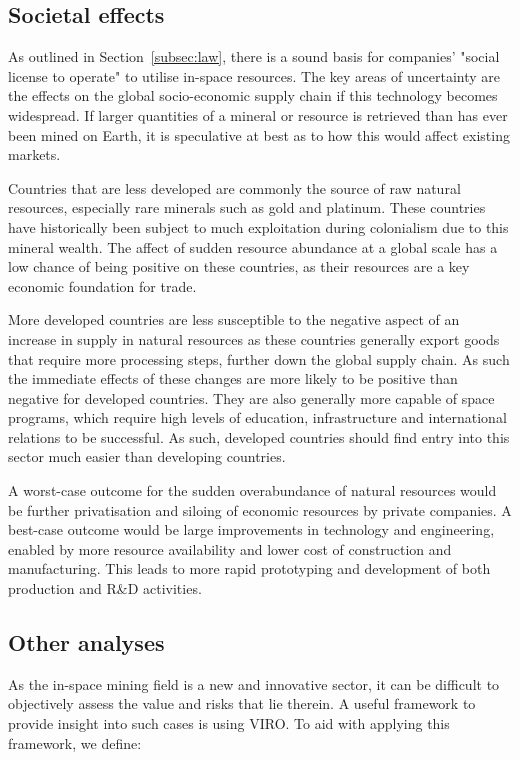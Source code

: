 \documentclass[conference]{IEEEtran}
\begin{document}
\subsection{Societal effects}
As outlined in Section~\ref{subsec:law}, there is a sound basis for companies' "social license to operate" to utilise in-space resources. The key areas of uncertainty are the effects on the global socio-economic supply chain if this technology becomes widespread. If larger quantities of a mineral or resource is retrieved than has ever been mined on Earth, it is speculative at best as to how this would affect existing markets. 

Countries that are less developed are commonly the source of raw natural resources, especially rare minerals such as gold and platinum. These countries have historically been subject to much exploitation during colonialism due to this mineral wealth. The affect of sudden resource abundance at a global scale has a low chance of being positive on these countries, as their resources are a key economic foundation for trade.

More developed countries are less susceptible to the negative aspect of an increase in supply in natural resources as these countries generally export goods that require more processing steps, further down the global supply chain. As such the immediate effects of these changes are more likely to be positive than negative for developed countries. They are also generally more capable of space programs, which require high levels of education, infrastructure and international relations to be successful. As such, developed countries should find entry into this sector much easier than developing countries.

A worst-case outcome for the sudden overabundance of natural resources would be further privatisation and siloing of economic resources by private companies. A best-case outcome would be large improvements in technology and engineering, enabled by more resource availability and lower cost of construction and manufacturing. This leads to more rapid prototyping and development of both production and R\&D activities.

\subsection{Other analyses}
As the in-space mining field is a new and innovative sector, it can be difficult to objectively assess the value and risks that lie therein. A useful framework to provide insight into such cases is using VIRO. To aid with applying this framework, we define:
\end{document}
